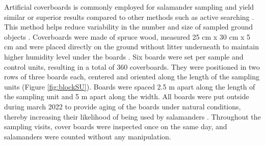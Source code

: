 Artificial coverboards is commonly employed for salamander sampling and yield similar or superior results compared to other methods such as active searching \citep{hydeSamplingPlethodontidSalamanders2001,mooreComparisonPopulationEastern2009c}. 
This method helps reduce variability in the number and size of sampled ground objects \citep{hydeSamplingPlethodontidSalamanders2001}. 
Coverboards were made of spruce wood, measured 25 cm x 30 cm x 5 cm and were placed directly on the ground without litter underneath to maintain higher humidity level under the boards \citep{mazerolleWoodlandSalamanderPopulation2021a}. 
Six boards were set per sample and control units, resulting in a total of 360 coverboards.
They were positioned in two rows of three boards each, centered and oriented along the length of the sampling units (Figure \ref{fig:blockSU}).
Boards were spaced 2.5 m apart along the length of the sampling unit and 5 m apart along the width.
All boards were put outside during march 2022 to provide aging of the boards under natural conditions, thereby increasing their likelihood of being used by salamanders \citep{hedrickEffectsCoverboardAge2021,smithEffectsCoverBoard2014a}.
Throughout the sampling visits, cover boards were inspected once on the same day, and salamanders were counted without any manipulation.

